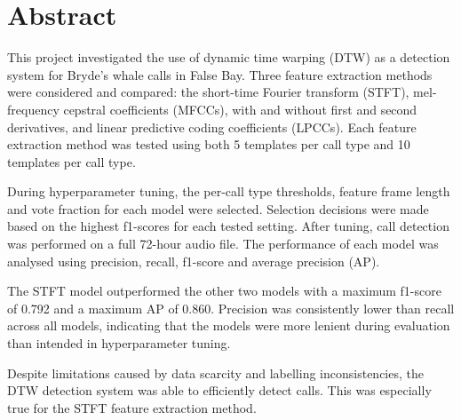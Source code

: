 \chapter*{Abstract}
\makeatletter{}\makeatother


This project investigated the use of dynamic time warping (\acs{DTW}) as a detection system for Bryde's whale calls in False Bay. Three 
feature extraction methods were considered and compared: the short-time Fourier transform (\acs{STFT}), mel-frequency cepstral coefficients 
(\acsp{MFCC}), with and 
without first and second derivatives, and linear predictive coding coefficients (\acsp{LPCC}). Each feature extraction method was tested using 
both 5 templates per call type and 10 templates per call type. 

During hyperparameter tuning, the per-call type thresholds, feature frame length and vote fraction for each model were selected. 
Selection decisions were made based on the highest f1-scores for each tested setting.
After tuning, call detection was performed on a full 72-hour audio file. The performance of each model was analysed using precision, recall, 
f1-score and average precision (\acs{AP}).

The \acs{STFT} model outperformed the other two models with a maximum f1-score of 0.792 and a maximum \acs{AP} of 0.860. 
Precision was consistently lower than recall across all models, indicating that the models were more lenient during evaluation than intended in hyperparameter 
tuning.

Despite limitations caused by data scarcity and labelling inconsistencies, the \acs{DTW} detection system was able to efficiently detect calls. This was 
especially true for the \acs{STFT} feature extraction method.